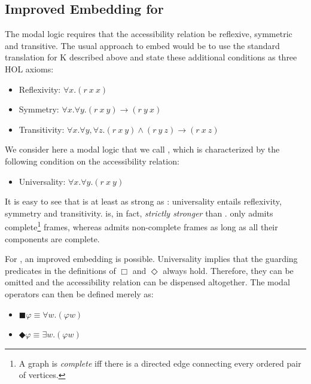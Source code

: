 \documentclass{article}
\newcommand{\BlackBox}{\blacksquare}
\newcommand{\BlackDia}{\Diamondblack}
\begin{document}
\subsection{Improved Embedding for \SFiveU}

The modal logic \SFive requires that the accessibility relation be reflexive, symmetric and transitive. The usual approach to embed \SFive would be to use the standard translation for K described above and state these additional conditions as three HOL axioms: 
\begin{itemize}
\item Reflexivity: $\forall x. (r~x~x)$
\item Symmetry: $\forall x. \forall y. (r~x~y) \rightarrow (r~y~x)$ 
\item Transitivity: $\forall x. \forall y, \forall z. (r~x~y) \wedge (r~y~z) \rightarrow (r~x~z)$
\end{itemize}

We consider here a modal logic that we call \SFiveU, which is characterized by the following condition on the accessibility relation:
\begin{itemize}
\item Universality: $\forall x. \forall y. (r~x~y)$
\end{itemize}

It is easy to see that \SFiveU is at least as strong as \SFive: universality entails reflexivity, symmetry and transitivity. \SFiveU is, in fact, \emph{strictly stronger} than \SFive. \SFiveU only admits complete\footnote{A graph is \emph{complete} iff there is a directed edge connecting every ordered pair of vertices.} frames, whereas \SFive admits non-complete frames as long as all their components are complete.

For \SFiveU, an improved embedding is possible. Universality implies that the guarding predicates in the definitions of $\Box$ and $\Diamond$ always hold. Therefore, they can be omitted and the accessibility relation can be dispensed altogether. The modal operators can then be defined merely as:
\begin{itemize}
\item $\BlackBox \varphi \equiv \forall w. (\varphi w)$ 
\item $\BlackDia \varphi \equiv \exists w. (\varphi w)$
\end{itemize}
\end{document}
